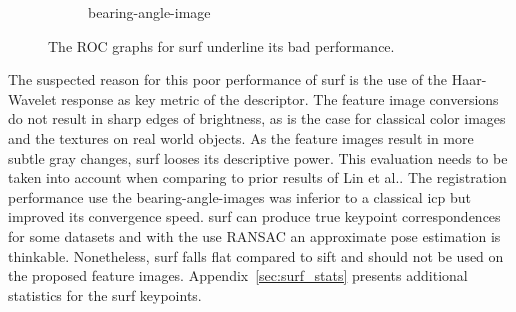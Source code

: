 \begin{figure}[H]
\begin{subfigure}[t]{0.45\linewidth}
    \caption{\gls{bearing-angle-image}}
\end{subfigure}
    \caption{The \acrshort{ROC} graphs for \acrshort{surf} underline its bad performance.}
\end{figure}
The suspected reason for this poor performance of \acrshort{surf} is the use of the Haar-Wavelet response as key metric of the descriptor.
The feature image conversions do not result in sharp edges of brightness, as is the case for classical color images and the textures on real world objects.
As the feature images result in more subtle gray changes, \acrshort{surf} looses its descriptive power.
This evaluation needs to be taken into account when comparing to prior results of Lin et al.\cite{lin_easp2017}.
The registration performance use the \glspl{bearing-angle-image} was inferior to a classical \acrshort{icp} but improved its convergence speed.
\acrshort{surf} can produce true keypoint correspondences for some datasets and with the use \acrshort{RANSAC} an approximate pose estimation is thinkable.
Nonetheless, \acrshort{surf} falls flat compared to \acrshort{sift} and should not be used on the proposed feature images.
Appendix~\ref{sec:surf_stats} presents additional statistics for the \acrshort{surf} keypoints.
